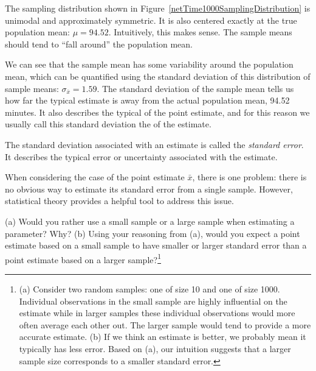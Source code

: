The sampling distribution shown in Figure~\ref{netTime1000SamplingDistribution} is unimodal and approximately symmetric. It is also centered exactly at the true population mean: $\mu=94.52$. Intuitively, this makes sense. The sample means should tend to ``fall around'' the population mean.

We can see that the sample mean has some variability around the population mean, which can be quantified using the standard deviation of this distribution of sample means: $\sigma_{\bar{x}} = 1.59$. The standard deviation of the sample mean tells us how far the typical estimate is away from the actual population mean, 94.52 minutes. It also describes the typical  of the point estimate, and for this reason we usually call this standard deviation the  of the estimate.

\begin{termBox}{
The standard deviation associated with an estimate is called the \emph{standard error}. It describes the typical error or uncertainty associated with the estimate.}
\end{termBox}

When considering the case of the point estimate $\bar{x}$, there is one problem: there is no obvious way to estimate its standard error from a single sample. However, statistical theory provides a helpful tool to address this issue. 

\begin{exercise}
(a) Would you rather use a small sample or a large sample when estimating a parameter? Why? (b) Using your reasoning from (a), would you expect a point estimate based on a small sample to have smaller or larger standard error than a point estimate based on a larger sample?\footnote{(a) Consider two random samples: one of size 10 and one of size 1000. Individual observations in the small sample are highly influential on the estimate while in larger samples these individual observations would more often average each other out. The larger sample would tend to provide a more accurate estimate. (b) If we think an estimate is better, we probably mean it typically has less error. Based on (a), our intuition suggests that a larger sample size corresponds to a smaller standard error.}
\end{exercise}

